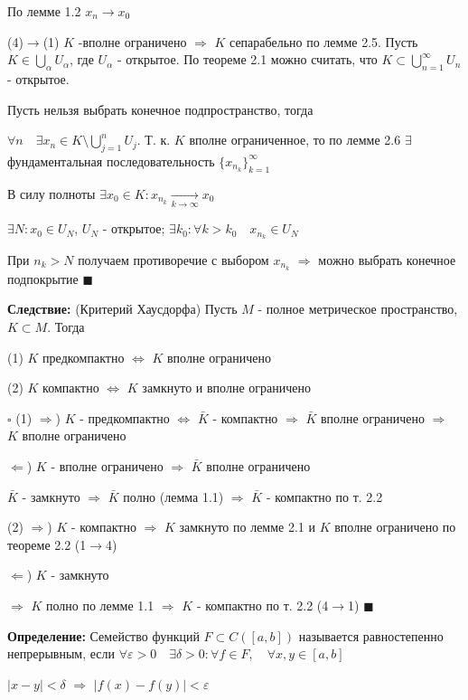 \documentclass[a4paper]{report}
\begin{document}
По лемме 1.2 $x_n\to x_0$

(4)$\to$(1) $K$ -вполне ограничено $\Rightarrow$ $K$ сепарабельно по лемме 2.5. Пусть $K\in\bigcup\limits_\alpha U_\alpha$,
где $U_\alpha$ - открытое. По теореме 2.1 можно считать, что $K\subset\bigcup\limits_{n=1}^\infty U_n$ - открытое.

Пусть нельзя выбрать конечное подпространство, тогда

$\forall n\quad\exists x_n\in K\setminus\bigcup\limits_{j=1}^n U_j$.
Т. к. $K$ вполне ограниченное, то по лемме 2.6 $\exists$ фундаментальная последовательность $\{x_{n_k}\}_{k=1}^\infty$

В силу полноты $\exists x_0\in K\colon x_{n_k}\xrightarrow[k\to\infty]{}x_0$

$\exists N\colon x_0\in U_N$, $U_N$ - открытое; $\exists k_0\colon\forall k>k_0\quad x_{n_k}\in U_N$

При $n_k>N$ получаем противоречие с выбором $x_{n_k}$ $\Rightarrow$ можно выбрать конечное подпокрытие $\blacksquare$
\bigskip

\noindent\textbf{Следствие:} (Критерий Хаусдорфа) Пусть $M$ - полное метрическое пространство, $K\subset M$. Тогда

(1) $K$ предкомпактно $\Leftrightarrow$ $K$ вполне ограничено

(2) $K$ компактно $\Leftrightarrow$ $K$ замкнуто и вполне ограничено

\noindent $\square$ (1) $\Rightarrow$) $K$ - предкомпактно $\Leftrightarrow$ $\bar K$ - компактно $\Rightarrow$ $\bar K$
вполне ограничено $\Rightarrow$ $K$ вполне ограничено

$\Leftarrow$) $K$ - вполне ограничено $\Rightarrow$ $\bar K$ вполне ограничено

$\bar K$ - замкнуто $\Rightarrow$ $\bar K$ полно (лемма 1.1) $\Rightarrow$ $\bar K$ - компактно по т. 2.2

(2) $\Rightarrow$) $K$ - компактно $\Rightarrow$ $K$ замкнуто по лемме 2.1 и $K$ вполне ограничено по теореме 2.2 (1$\to$4)

$\Leftarrow$) $K$ - замкнуто

$\Rightarrow$ $K$ полно по лемме 1.1 $\Rightarrow$ $K$ - компактно по т. 2.2
(4$\to$1) $\blacksquare$
\bigskip

\noindent\textbf{Определение:} Семейство функций $F\subset C([a,b])$ называется равностепенно непрерывным, если
$\forall\varepsilon>0\quad\exists\delta>0\colon\forall f\in F,\quad\forall x,y\in[a,b]$

$|x-y|<\delta$ $\Rightarrow$ $|f(x)-f(y)|<\varepsilon$
\bigskip
\end{document}
